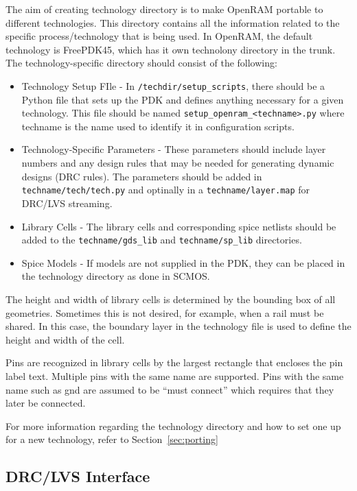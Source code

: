 The aim of creating technology directory is to make OpenRAM portable
to different technologies. This directory contains all the information
related to the specific process/technology that is being used.  In
OpenRAM, the default technology is FreePDK45, which has it own
technolony directory in the trunk.  The technology-specific directory
should consist of the following:
\begin{itemize}
\item Technology Setup FIle - In \verb|/techdir/setup_scripts|, there
  should be a Python file that sets up the PDK and defines anything
  necessary for a given technology. This file should be named
  \verb|setup_openram_<techname>.py| where techname is the name used
  to identify it in configuration scripts.
\item Technology-Specific Parameters - These parameters should include
  layer numbers and any design rules that may be needed for generating
  dynamic designs (DRC rules). The parameters should be added in
  \verb|techname/tech/tech.py| and optinally in a \verb|techname/layer.map| for
  DRC/LVS streaming. 
\item Library Cells - The library cells and corresponding spice
  netlists should be added to the \verb|techname/gds_lib| and
  \verb|techname/sp_lib| directories.
\item Spice Models - If models are not supplied in the PDK, they can be
  placed in the technology directory as done in SCMOS.
\end{itemize}

The height and width of library cells is determined by the bounding
box of all geometries. Sometimes this is not desired, for example,
when a rail must be shared. In this case, the boundary layer in the
technology file is used to define the height and width of the cell.

Pins are recognized in library cells by the largest rectangle that
encloses the pin label text. Multiple pins with the same name are
supported.  Pins with the same name such as gnd are assumed to be
``must connect'' which requires that they later be connected.

For more information regarding the technology directory and how to set
one up for a new technology, refer to Section~\ref{sec:porting}

\subsection{DRC/LVS Interface}
\label{sec:drclvs}

